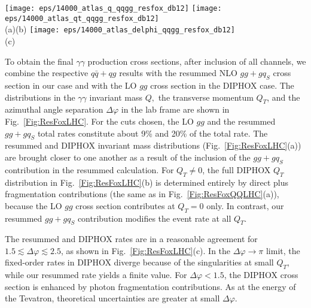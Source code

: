 \documentclass[12pt,english,aps,preprint,prd,letterpaper,fleqn,nofootinbib,showpacs,showkeys,tightenlines,floatfix]{revtex4}
\begin{document}
{\begin{figure*}
\texttt{[image: eps/14000\_atlas\_q\_qqgg\_resfox\_db12]}
\texttt{[image: eps/14000\_atlas\_qt\_qqgg\_resfox\_db12]}\\
(a)\hspace{3in}(b)
\texttt{[image: eps/14000\_atlas\_delphi\_qqgg\_resfox\_db12]}\\
(c)


\caption{Invariant mass, transverse momentum, and $\Delta\varphi$ distributions
from our resummed calculation and from \textsc{DIPHOX} at the LHC.
We show our fixed-order (dashed) and resummed (solid) distributions.
All initial states are included in both calculations, and the
single-$\gamma$ fragmentation contributions are included in \textsc{DIPHOX}.}

\label{Fig:ResFoxLHC} 
\end{figure*}


To obtain the final $\gamma\gamma$ production cross sections, after
inclusion of all channels, we combine the respective $q\bar{q}+qg$
results with the resummed NLO $gg+gq_{S}$ cross section in our case
and with the LO $gg$ cross section in the DIPHOX case. The distributions
in the $\gamma\gamma$ invariant mass $Q,$ the transverse momentum
$Q_{T}$, and the azimuthal angle separation $\Delta\varphi$ in the
lab frame are shown in Fig.~\ref{Fig:ResFoxLHC}. For the cuts chosen,
the LO $gg$ and the resummed $gg+gq_{S}$ total rates constitute
about 9\% and 20\% of the total rate. The resummed and DIPHOX invariant
mass distributions (Fig.~\ref{Fig:ResFoxLHC}(a)) are brought closer
to one another as a result of the inclusion of the $gg+gq_{S}$ contribution
in the resummed calculation. For $Q_{T}\neq0$, the full DIPHOX $Q_{T}$
distribution in Fig.~\ref{Fig:ResFoxLHC}(b) is determined entirely
by direct plus fragmentation contributions (the same as in Fig.~\ref{Fig:ResFoxQQLHC}(a)),
because the LO $gg$ cross section contributes at $Q_{T}=0$ only.
In contrast, our resummed $gg+gq_{S}$ contribution modifies the event
rate at all $Q_{T}$.

The resummed and DIPHOX rates are in a reasonable agreement for $1.5\lesssim\Delta\varphi\lesssim2.5$,
as shown in Fig.~\ref{Fig:ResFoxLHC}(c). In the $\Delta\varphi\rightarrow\pi$
limit, the fixed-order rates in DIPHOX diverge because of the singularities
at small $Q_{T}$, while our resummed rate yields a finite value.
For $\Delta\varphi<1.5$, the DIPHOX cross section is enhanced by
photon fragmentation contributions. As at the energy of the Tevatron,
theoretical uncertainties are greater at small $\Delta\varphi$. 

}
\end{document}
